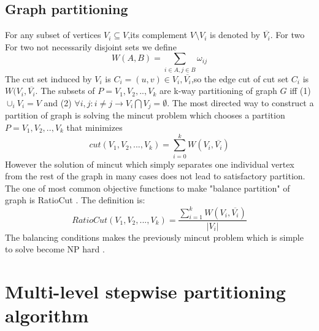 \documentclass{acm_proc_article-sp}
\begin{document}
\subsection{Graph partitioning}
For any subset of vertices $V_{i} \subseteq V$,its complement $V \setminus V_{i}$ is denoted by $\overline{V_{i}}$. For two For two not necessarily disjoint sets we define
\begin{displaymath}
W(A,B)=\sum_{i\in A,j\in B}\omega_{ij}
\end{displaymath}
The cut set induced by $V_{i}$ is $C_{i}={(u,v)\in V_{i},\overline{V_{i}}}$,so the edge cut of cut set $C_{i}$ is $W(V_{i},\overline{V_{i}}$. The subsets of $P=V_{1},V_{2},..,V_{k}$ are k-way partitioning of graph $G$ iff (1) $\cup_{i}V_{i}=V$ and (2) $\forall i,j:i\neq j\rightarrow V_{i}\bigcap V_{j}=\emptyset$. The most directed way to construct a partition of graph is solving the mincut problem which chooses a partition  $P=V_{1},V_{2},..,V_{k}$ that minimizes
\begin{displaymath}
cut(V_{1},V_{2},...,V_{k})=\sum_{i=0}^{k}W(V_{i},\overline{V_{i}})
\end{displaymath}
However the solution of mincut which simply separates one individual vertex from the rest of the graph in many cases does not lead to satisfactory partition. The one of most common objective functions to make "balance partition" of graph is RatioCut \cite{w.hagen:new}. The definition is:
\begin{displaymath}
RatioCut(V_{1},V_{2},...,V_{k})=\frac{\sum_{i=1}^{k}W(V_{i},\overline{V_{i}})}{|V_{i}|}
\end{displaymath}
The balancing conditions makes the previously mincut problem which is simple to solve become NP hard \cite{wagner:mincut}.

\section{Multi-level stepwise partitioning algorithm}
\end{document}
